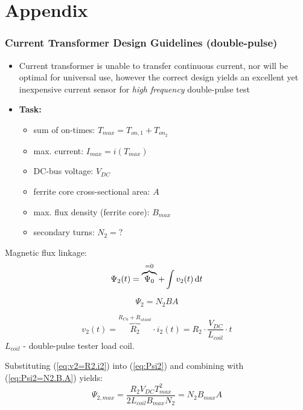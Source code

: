 \part*{Appendix}
\section{Current Transformer Design Guidelines (double-pulse)}
\begin{itemize}
    \item Current transformer is unable to transfer continuous current, nor will be optimal for universal use, however the correct design yields an excellent yet inexpensive current sensor for \textit{high frequency} double-pulse test
	\newpage
    \item \textbf{Task:}
	\begin{itemize}
	    \item sum of on-times: $T_{max} = T_{on,1}+T_{on_2}$
	    \item max. current: $I_{max} = i(T_{max})$
	    \item DC-bus voltage: $V_{DC}$
	    \item ferrite core cross-sectional area: $A$
	    \item max. flux density (ferrite core): $B_{max}$
	    \item secondary turns: $N_2 = ?$
	\end{itemize}
\end{itemize}


Magnetic flux linkage:
\begin{equation}
    \Psi_2(t) = \overbrace{\Psi_0}^{=0} + \int v_2(t) \, \mathrm{d} t
    \label{eq:Psi2}
\end{equation}

\begin{equation}
    \Psi_2 = N_2 B A
    \label{eq:Psi2=N2.B.A}
\end{equation}

\begin{equation}
    v_2(t) = \overbrace{R_2}^{R_{Cu}+R_{shunt}} \cdot i_2(t) = R_2 \cdot \frac{V_{DC}}{L_{coil}}\cdot t
    \label{eq:v2=R2.i2}
\end{equation}
$L_{coil}$ - double-pulse tester load coil.

Substituting (\ref{eq:v2=R2.i2}) into (\ref{eq:Psi2}) and combining with (\ref{eq:Psi2=N2.B.A}) yields:
\begin{equation}
    \Psi_{2,max} = \frac{R_2 V_{DC} T_{max}^2}{2 L_{coil} B_{max} N_2} = N_2 B_{max} A
    \label{eq:Psi2max}
\end{equation}

